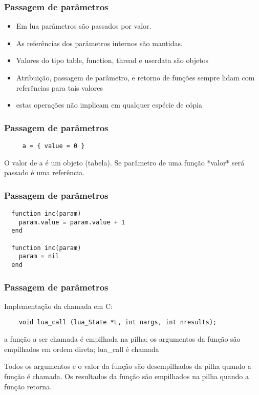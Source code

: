 \begin{frame}
  \frametitle{Passagem de parâmetros}
  \begin{block}{}
    \begin{itemize}
    \item Em lua parâmetros são passados por valor.
    \item As referências dos parâmetros internos são mantidas.
    \item Valores do tipo table, function, thread e userdata são objetos
    \item Atribuição, passagem de parâmetro, e retorno de
          funções sempre lidam com referências para tais valores
    \item estas operações não implicam em qualquer espécie de cópia
    \end{itemize}
  \end{block}
\end{frame}

\begin{frame}[fragile]
  \frametitle{Passagem de parâmetros}
  \begin{block}{}
   \begin{lstlisting}
     a = { value = 0 }
   \end{lstlisting}
   \begin{block}{}
     O valor de a é um objeto (tabela). Se parâmetro de
     uma função *valor* será passado é uma
     referência.
   \end{block}
  \end{block}
\end{frame}

\begin{frame}[fragile]
  \frametitle{Passagem de parâmetros}
  \begin{lstlisting}
  function inc(param)
    param.value = param.value + 1
  end
  
  function inc(param)
    param = nil
  end
  \end{lstlisting}
\end{frame}

\begin{frame}[fragile]
  \frametitle{Passagem de parâmetros}
  \begin{block}{}
    Implementação da chamada em C:
    
    \begin{lstlisting}
    void lua_call (lua_State *L, int nargs, int nresults);
    \end{lstlisting}
    
    a função a ser chamada é empilhada na pilha;
    os argumentos da função são empilhados em ordem direta;
    lua\_call é chamada 
    
    Todos os argumentos e o valor da função são desempilhados
    da pilha quando a função é chamada. 
    Os resultados da função são empilhados na pilha quando
    a função retorna. 
  \end{block}
\end{frame}
